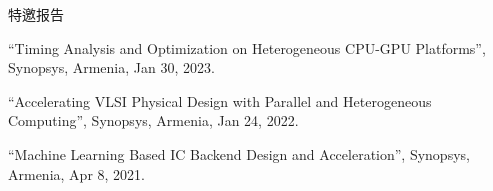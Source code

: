 \begin{rSection}{特邀报告}
\begin{description}[font=\normalfont]
\item[{[3]}]{
``Timing Analysis and Optimization on Heterogeneous CPU-GPU Platforms'', Synopsys, Armenia, Jan 30, 2023. 
}

\item[{[2]}]{
``Accelerating VLSI Physical Design with Parallel and Heterogeneous Computing'', Synopsys, Armenia, Jan 24, 2022. 
}

\item[{[1]}]{
``Machine Learning Based IC Backend Design and Acceleration'', Synopsys, Armenia, Apr 8, 2021. 
}

\end{description}

\end{rSection}
